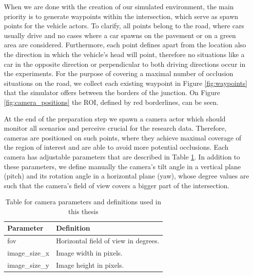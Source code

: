 When we are done with the creation of our simulated environment, the main priority is to generate waypoints within the intersection, which serve as spawn points for the vehicle actors. To clarify, all points belong to the road, where cars usually drive and no cases where a car spawns on the pavement or on a green area are considered. Furthermore, each point defines apart from the location also the direction in which the vehicle's head will point, therefore no situations like a car in the opposite direction or perpendicular to both driving directions occur in the experiments. For the purpose of covering a maximal number of occlusion situations on the road, we collect each existing waypoint in Figure \ref{fig:waypoints} that the simulator offers between the borders of the junction. On Figure \ref{fig:camera_positions} the ROI, defined by red borderlines, can be seen.

At the end of the preparation step we spawn a camera actor which should monitor all scenarios and perceive crucial for the research data. Therefore, cameras are positioned on such points, where they achieve maximal coverage of the region of interest and are able to avoid more potential occlusions. Each camera has adjustable parameters that are described in Table \ref{tab:camera_params}. In addition to these parameters, we define manually the camera's tilt angle in a vertical plane (pitch) and its rotation angle in a horizontal plane (yaw), whose degree values are such that the camera's field of view covers a bigger part of the intersection. 
\begin{table}[h]
\caption{Table for camera parameters and definitions used in this thesis\label{tab:camera_params}}
\centering
    \begin{tabular}{ | l | p{5cm} |}
    \hline
    Parameter & Definition  \\ \hline
    fov & Horizontal field of view in degrees. \\ \hline
    image\_size\_x & Image width in pixels. \\ \hline
    image\_size\_y & Image height in pixels. \\ \hline
    \end{tabular}
\end{table}

